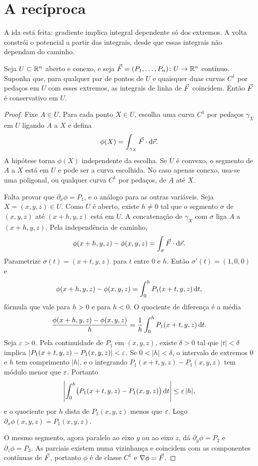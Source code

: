\documentclass[11pt,a4paper]{article}
\begin{document}
\section{A recíproca}

A ida está feita: gradiente implica integral dependente só dos extremos. A volta constrói o potencial a partir das integrais, desde que essas integrais não dependam do caminho.


\begin{teorema}
\label{thm:reciproca}
Seja $U\subset\mathbb{R}^n$ aberto e conexo, e seja $\vec{F}=(P_1,\ldots,P_n)\colon U\to\mathbb{R}^n$ contínuo. Suponha que, para qualquer par de pontos de $U$ e quaisquer duas curvas $C^1$ por pedaços em $U$ com esses extremos, as integrais de linha de $\vec{F}$ coincidem. Então $\vec{F}$ é conservativo em $U$.
\end{teorema}

\begin{proof}
Fixe $A\in U$. Para cada ponto $X\in U$, escolha uma curva $C^1$ por pedaços $\gamma_X$ em $U$ ligando $A$ a $X$ e defina
\[
\phi(X)=\int_{\gamma_X}\vec{F}\cdot\mathrm{d}\vec{r}.
\]
A hipótese torna $\phi(X)$ independente da escolha. Se $U$ é convexo, o segmento de $A$ a $X$ está em $U$ e pode ser a curva escolhida. No caso apenas conexo, usa-se uma poligonal, ou qualquer curva $C^1$ por pedaços, de $A$ até $X$.

Falta provar que $\partial_x\phi=P_1$, e o análogo para as outras variáveis. Seja $X=(x,y,z)\in U$. Como $U$ é aberto, existe $h\neq 0$ tal que o segmento $\sigma$ de $(x,y,z)$ até $(x+h,y,z)$ está em $U$. A concatenação de $\gamma_X$ com $\sigma$ liga $A$ a $(x+h,y,z)$. Pela independência de caminho,
\[
\phi(x+h,y,z)-\phi(x,y,z)=\int_\sigma\vec{F}\cdot\mathrm{d}\vec{r}.
\]
Parametrize $\sigma(t)=(x+t,y,z)$ para $t$ entre $0$ e $h$. Então $\sigma'(t)=(1,0,0)$ e
\[
\phi(x+h,y,z)-\phi(x,y,z)
=\int_0^h P_1(x+t,y,z)\,\mathrm{d} t,
\]
fórmula que vale para $h>0$ e para $h<0$. O quociente de diferença é a média
\[
\frac{\phi(x+h,y,z)-\phi(x,y,z)}{h}
=\frac{1}{h}\int_0^h P_1(x+t,y,z)\,\mathrm{d} t.
\]
Seja $\varepsilon>0$. Pela continuidade de $P_1$ em $(x,y,z)$, existe $\delta>0$ tal que $|t|<\delta$ implica $|P_1(x+t,y,z)-P_1(x,y,z)|<\varepsilon$. Se $0<|h|<\delta$, o intervalo de extremos $0$ e $h$ tem comprimento $|h|$, e o integrando $P_1(x+t,y,z)-P_1(x,y,z)$ tem módulo menor que $\varepsilon$. Portanto
\[
\Biggl|\int_0^h\bigl(P_1(x+t,y,z)-P_1(x,y,z)\bigr)\,\mathrm{d} t\Biggr|
\le\varepsilon\,|h|,
\]
e o quociente por $h$ dista de $P_1(x,y,z)$ menos que $\varepsilon$. Logo $\partial_x\phi(x,y,z)=P_1(x,y,z)$.

O mesmo segmento, agora paralelo ao eixo $y$ ou ao eixo $z$, dá $\partial_y\phi=P_2$ e $\partial_z\phi=P_3$. As parciais existem numa vizinhança e coincidem com as componentes contínuas de $\vec{F}$, portanto $\phi$ é de classe $C^1$ e $\nabla\phi=\vec{F}$.
\end{proof}
\end{document}
